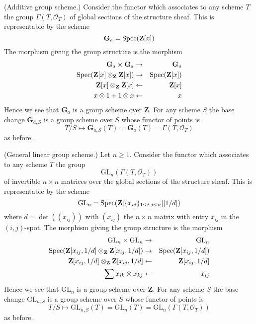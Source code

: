 \begin{example}
\label{example-additive-group}
(Additive group scheme.)
Consider the functor which associates
to any scheme $T$ the group $\Gamma(T, \mathcal{O}_T)$
of global sections of the structure sheaf.
This is representable by the scheme
$$
\mathbf{G}_a = \mathop{\rm Spec}(\mathbf{Z}[x])
$$
The morphism giving the group structure is the morphism
\begin{eqnarray*}
\mathbf{G}_a \times \mathbf{G}_a & \to & \mathbf{G}_a \\
\mathop{\rm Spec}(\mathbf{Z}[x] \otimes_{\mathbf{Z}} \mathbf{Z}[x])
& \to &
\mathop{\rm Spec}(\mathbf{Z}[x]) \\
\mathbf{Z}[x] \otimes_{\mathbf{Z}} \mathbf{Z}[x]
& \leftarrow &
\mathbf{Z}[x] \\
x \otimes 1 + 1 \otimes x & \leftarrow & x
\end{eqnarray*}
Hence we see that $\mathbf{G}_a$ is a group scheme over $\mathbf{Z}$.
For any scheme $S$ the base change $\mathbf{G}_{a, S}$ is a
group scheme over $S$ whose functor of points is
$$
T/S
\longmapsto
\mathbf{G}_{a, S}(T) = \mathbf{G}_a(T) = \Gamma(T, \mathcal{O}_T)
$$
as before.
\end{example}

\begin{example}
\label{example-general-linear-group}
(General linear group scheme.)
Let $n \geq 1$.
Consider the functor which associates
to any scheme $T$ the group
$$
\text{GL}_n(\Gamma(T, \mathcal{O}_T))
$$
of invertible $n \times n$ matrices over
the global sections of the structure sheaf.
This is representable by the scheme
$$
\text{GL}_n = \mathop{\rm Spec}(\mathbf{Z}[\{x_{ij}\}_{1 \leq i, j \leq n}][1/d])
$$
where $d = \det((x_{ij}))$ with $(x_{ij})$ the $n \times n$ matrix
with entry $x_{ij}$ in the $(i, j)$-spot.
The morphism giving the group structure is the morphism
\begin{eqnarray*}
\text{GL}_n \times \text{GL}_n & \to & \text{GL}_n \\
\mathop{\rm Spec}(\mathbf{Z}[x_{ij}, 1/d] \otimes_{\mathbf{Z}}
\mathbf{Z}[x_{ij}, 1/d])
& \to &
\mathop{\rm Spec}(\mathbf{Z}[x_{ij}, 1/d]) \\
\mathbf{Z}[x_{ij}, 1/d] \otimes_{\mathbf{Z}} \mathbf{Z}[x_{ij}, 1/d]
& \leftarrow &
\mathbf{Z}[x_{ij}, 1/d] \\
\sum x_{ik} \otimes x_{kj} & \leftarrow & x_{ij}
\end{eqnarray*}
Hence we see that $\text{GL}_n$ is a group scheme over $\mathbf{Z}$.
For any scheme $S$ the base change $\text{GL}_{n, S}$ is a
group scheme over $S$ whose functor of points is
$$
T/S
\longmapsto
\text{GL}_{n, S}(T) = \text{GL}_n(T) =\text{GL}_n(\Gamma(T, \mathcal{O}_T))
$$
as before.
\end{example}

